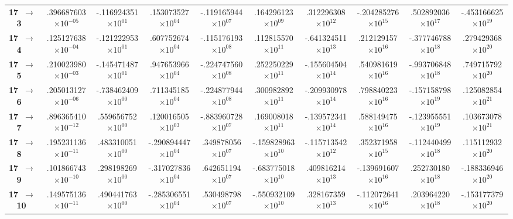 \documentclass[reviewcopy]{elsarticle}
\begin{document}
\begin{landscape}
\begin{longtable}{lccccccccc}
{\bf 17~$\to$~ 3}   &   .396687603$\times10^{-05}$ & -.116924351$\times10^{ 01}$ &  .153073527$\times10^{ 04}$ & -.119165944$\times10^{ 07}$ &  .164296123$\times10^{ 09}$ &  .312296308$\times10^{ 12}$ & -.204285276$\times10^{ 15}$ &  .502892036$\times10^{ 17}$ & -.453166625$\times10^{ 19}$ \\
{\bf 17~$\to$~ 4}   &   .125127638$\times10^{-04}$ & -.121222953$\times10^{ 01}$ &  .607752674$\times10^{ 04}$ & -.115176193$\times10^{ 08}$ &  .112815570$\times10^{ 11}$ & -.641324511$\times10^{ 13}$ &  .212129157$\times10^{ 16}$ & -.377746788$\times10^{ 18}$ &  .279429368$\times10^{ 20}$ \\
{\bf 17~$\to$~ 5}   &   .210023980$\times10^{-03}$ & -.145471487$\times10^{ 01}$ &  .947653966$\times10^{ 04}$ & -.224747560$\times10^{ 08}$ &  .252250229$\times10^{ 11}$ & -.155604504$\times10^{ 14}$ &  .540981619$\times10^{ 16}$ & -.993706848$\times10^{ 18}$ &  .749715792$\times10^{ 20}$ \\
{\bf 17~$\to$~ 6}   &   .205013127$\times10^{-06}$ & -.738462409$\times10^{ 00}$ &  .711345185$\times10^{ 04}$ & -.224877944$\times10^{ 08}$ &  .300982892$\times10^{ 11}$ & -.209930978$\times10^{ 14}$ &  .798840223$\times10^{ 16}$ & -.157158798$\times10^{ 19}$ &  .125082854$\times10^{ 21}$ \\
{\bf 17~$\to$~ 7}   &   .896365410$\times10^{-12}$ &  .559656752$\times10^{ 00}$ &  .120016505$\times10^{ 03}$ & -.883960728$\times10^{ 07}$ &  .169008018$\times10^{ 11}$ & -.139572341$\times10^{ 14}$ &  .588149475$\times10^{ 16}$ & -.123955551$\times10^{ 19}$ &  .103673078$\times10^{ 21}$ \\
{\bf 17~$\to$~ 8}   &   .195231136$\times10^{-11}$ &  .483310051$\times10^{ 00}$ & -.290894447$\times10^{ 04}$ &  .349878056$\times10^{ 07}$ & -.159828963$\times10^{ 10}$ & -.115713542$\times10^{ 12}$ &  .352371958$\times10^{ 15}$ & -.112440499$\times10^{ 18}$ &  .115112932$\times10^{ 20}$ \\
{\bf 17~$\to$~ 9}   &   .101866743$\times10^{-10}$ &  .298198269$\times10^{ 00}$ & -.317027836$\times10^{ 04}$ &  .642651194$\times10^{ 07}$ & -.683775018$\times10^{ 10}$ &  .409816214$\times10^{ 13}$ & -.139691607$\times10^{ 16}$ &  .252730180$\times10^{ 18}$ & -.188336946$\times10^{ 20}$ \\
{\bf 17~$\to$~ 10}  &   .149575136$\times10^{-11}$ &  .490441763$\times10^{ 00}$ & -.285306551$\times10^{ 04}$ &  .530498798$\times10^{ 07}$ & -.550932109$\times10^{ 10}$ &  .328167359$\times10^{ 13}$ & -.112072641$\times10^{ 16}$ &  .203964220$\times10^{ 18}$ & -.153177379$\times10^{ 20}$ \\

\end{longtable}
\end{landscape}
\end{document}
